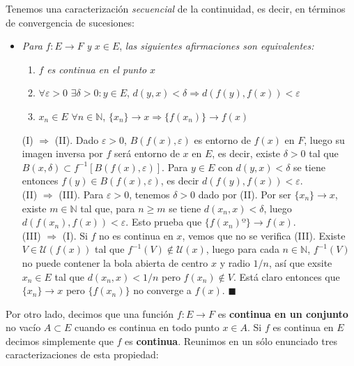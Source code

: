\documentclass[a4paper, 12pt]{article}
\begin{document}
\begin{enumerate}[label=\textbf{\arabic*}.]
\begin{enumerate}[label=\textit{\alph*})]
Tenemos una caracterización \textit{secuencial} de la continuidad, es decir, en términos de convergencia de sucesiones:
	
	\begin{itemize}
	\item \textit{Para} \(f: E \rightarrow F\) \textit{y} \(x \in E\), \textit{las siguientes afirmaciones son equivalentes:}
	\begin{enumerate}[label=(\textit{\roman*})]
		\item \(f\) \textit{es continua en el punto} \(x\)
		\item \(\forall \varepsilon > 0\) \(\exists \delta > 0 : y \in E\), \(d(y,x) < \delta \Rightarrow d(f(y),f(x)) < \varepsilon\)
		\item \(x_n \in E\) \(\forall n \in \mathbb{N}\), \(\{x_n\} \rightarrow x \Rightarrow \{f(x_n)\} \rightarrow f(x)\)
	\end{enumerate}

(I) \(\Rightarrow\) (II). Dado \(\varepsilon > 0\), \(B(f(x), \varepsilon)\) es entorno de \(f(x)\) en \(F\), luego su imagen inversa por \(f\) será entorno de \(x\) en \(E\), es decir, existe \(\delta >0\) tal que \(B(x, \delta) \subset f^{-1}[B(f(x),\varepsilon)]\). Para \(y \in E\) con \(d(y,x) < \delta\) se tiene entonces \(f(y) \in B(f(x), \varepsilon)\), es decir \(d(f(y),f(x)) < \varepsilon\). \\

(II) \(\Rightarrow\) (III). Para \(\varepsilon > 0 \), tenemos \(\delta > 0\) dado por (II). Por ser \(\{x_n\} \rightarrow x\), existe \(m \in \mathbb{N}\) tal que, para \(n \geq m\) se tiene \(d(x_n, x) < \delta\), luego \(d(f(x_n),f(x)) < \varepsilon\). Esto prueba que \(\{f(x_n)º\} \rightarrow f(x)\). \\

(III) \(\Rightarrow\) (I). Si \(f\) no es continua en \(x\), vemos que no se verifica (III). Existe \(V \in \mathcal{U}(f(x))\) tal que \(f^{-1}(V) \notin \mathcal{U}(x)\), luego para cada \(n \in \mathbb{N}\), \(f^{-1}(V)\) no puede contener la bola abierta de centro \(x\) y radio \(1/n\), así que exsite \(x_n \in E\) tal que \(d(x_n,x) < 1/n\) pero \(f(x_n) \notin V\). Está claro entonces que \(\{x_n\} \rightarrow x\) pero \(\{f(x_n)\}\) no converge a \(f(x)\). \hspace{10.2cm} \(\blacksquare\) \\

\end{itemize}
\medskip

Por otro lado, decimos que una función \(f: E \rightarrow F\) es \textbf{continua en un conjunto} no vacío \(A \subset E\) cuando es continua en todo punto \(x \in A\). Si \(f\) es continua en \(E\) decimos simplemente que \(f\) es \textbf{continua}. Reunimos en un sólo enunciado tres caracterizaciones de esta propiedad:


\end{enumerate}
\end{enumerate}
\end{document}
